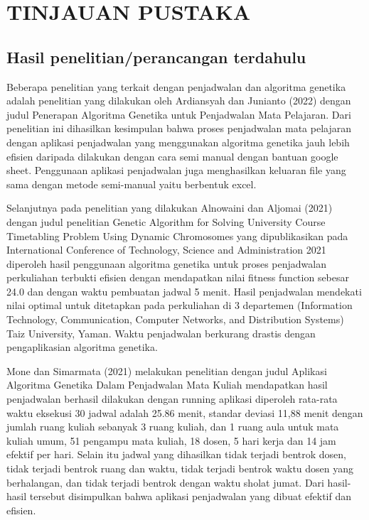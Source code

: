 \chapter{TINJAUAN PUSTAKA}

\section{Hasil penelitian/perancangan terdahulu}
Beberapa penelitian yang terkait dengan penjadwalan dan algoritma genetika adalah 
\linebreak penelitian yang dilakukan oleh Ardiansyah dan Junianto (2022) 
dengan judul Penerapan \linebreak Algoritma Genetika untuk Penjadwalan Mata Pelajaran. 
Dari penelitian ini dihasilkan kesimpulan bahwa proses penjadwalan mata pelajaran dengan 
aplikasi penjadwalan yang menggunakan algoritma genetika jauh lebih efisien daripada 
dilakukan dengan cara semi manual dengan bantuan google sheet. Penggunaan aplikasi 
penjadwalan juga menghasilkan keluaran file yang sama dengan metode semi-manual yaitu berbentuk excel.

Selanjutnya pada penelitian yang dilakukan Alnowaini dan Aljomai (2021) dengan judul penelitian 
Genetic Algorithm for Solving University Course Timetabling Problem Using Dynamic Chromosomes 
yang dipublikasikan pada International Conference of Technology, Science and Administration 2021 
diperoleh hasil penggunaan algoritma genetika untuk proses penjadwalan perkuliahan terbukti efisien 
dengan mendapatkan nilai fitness function sebesar 24.0 dan dengan waktu pembuatan jadwal 5 menit. 
Hasil penjadwalan mendekati nilai optimal untuk ditetapkan pada perkuliahan di 3 departemen 
(Information Technology, Communication, Computer Networks, and Distribution Systems) Taiz University, Yaman. 
Waktu penjadwalan berkurang drastis dengan pengaplikasian algoritma genetika.

Mone dan Simarmata (2021) melakukan penelitian dengan judul 
Aplikasi Algoritma \linebreak Genetika Dalam Penjadwalan Mata Kuliah mendapatkan hasil 
penjadwalan berhasil dilakukan dengan running aplikasi diperoleh rata-rata waktu eksekusi 
30 jadwal adalah 25.86 menit, standar deviasi 11,88 menit dengan jumlah ruang kuliah sebanyak 3 
ruang kuliah, dan 1 ruang aula untuk mata kuliah umum, 51 pengampu mata kuliah, 18 dosen, 5 hari 
kerja dan 14 jam efektif per hari. Selain itu jadwal yang dihasilkan tidak terjadi bentrok dosen, 
tidak terjadi bentrok ruang dan waktu, tidak terjadi bentrok waktu dosen yang berhalangan, 
dan tidak terjadi bentrok dengan waktu sholat jumat. Dari hasil-hasil tersebut disimpulkan 
bahwa aplikasi penjadwalan yang dibuat efektif dan efisien.



